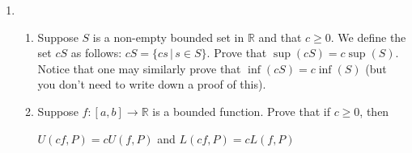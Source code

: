 \documentclass[11pt]{exam}
\begin{document}
\begin{enumerate}
\begin{solution}
\begin{enumerate}
                    \end{enumerate}
                \end{solution}
        \item 
            \begin{enumerate}
                \item Suppose \( S \) is a non-empty bounded set in \( \mathbb{R} \) and that \( c \geq 0 \). We define the set \( cS \) as follows: \( cS = \{cs \,|\, s \in S\} \).
                Prove that \( \sup(cS) = c \sup(S) \). Notice that one may similarly prove that \( \inf(cS) = c \inf(S) \) (but you don't need to write down a proof of this).
                \item Suppose \( f : [a, b] \rightarrow \mathbb{R} \) is a bounded function. Prove that if \( c \geq 0 \), then
    
                \( U(cf, P) = c U(f, P) \) and \( L(cf, P) = c L(f, P) \)
                

\end{enumerate}
\end{enumerate}
\end{document}
